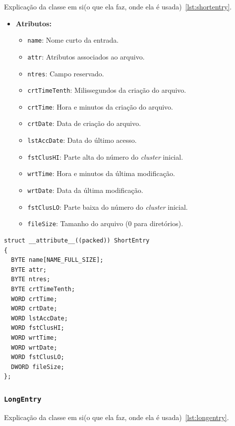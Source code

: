 \documentclass[
    12pt,				%
    oneside,   	        %
    a4paper,			%
    english,			%
    french,				%
    spanish,			%
    brazil,				%
    ]{pacotes/abntex2}
\begin{document}
Explicação da classe em si(o que ela faz, onde ela é usada)~\ref{lst:shortentry}.

\begin{itemize}
    \item \textbf{Atributos:}
        \begin{itemize}
            \item \texttt{name}: Nome curto da entrada.
            \item \texttt{attr}: Atributos associados ao arquivo.
            \item \texttt{ntres}: Campo reservado.
            \item \texttt{crtTimeTenth}: Milissegundos da criação do arquivo.
            \item \texttt{crtTime}: Hora e minutos da criação do arquivo.
            \item \texttt{crtDate}: Data de criação do arquivo.
            \item \texttt{lstAccDate}: Data do último acesso.
            \item \texttt{fstClusHI}: Parte alta do número do \textit{cluster} inicial.
            \item \texttt{wrtTime}: Hora e minutos da última modificação.
            \item \texttt{wrtDate}: Data da última modificação.
            \item \texttt{fstClusLO}: Parte baixa do número do \textit{cluster} inicial.
            \item \texttt{fileSize}: Tamanho do arquivo (0 para diretórios).
        \end{itemize}
\end{itemize}

\begin{lstlisting}[caption={Estrutura que representa uma entrada curta no sistema de arquivos}, label={lst:shortentry}] 
struct __attribute__((packed)) ShortEntry
{
  BYTE name[NAME_FULL_SIZE];
  BYTE attr; 
  BYTE ntres;
  BYTE crtTimeTenth;
  WORD crtTime; 
  WORD crtDate; 
  WORD lstAccDate;
  WORD fstClusHI; 
  WORD wrtTime;
  WORD wrtDate;
  WORD fstClusLO;
  DWORD fileSize;
};
\end{lstlisting}

\subsubsection{\texttt{LongEntry}}
\label{subsubsec:long_entry}

Explicação da classe em si(o que ela faz, onde ela é usada)~\ref{lst:longentry}.
\end{document}
